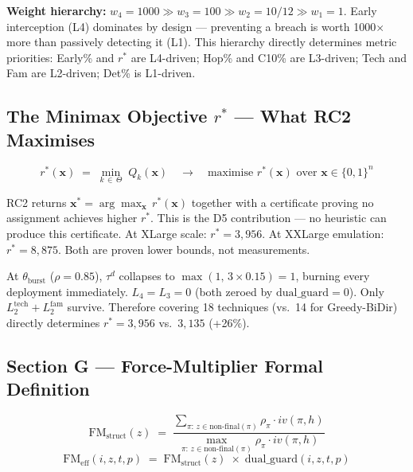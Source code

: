 \documentclass[12pt,a4paper]{article}
\newcommand{\rstar}{r^*}
\newcommand{\xvec}{\mathbf{x}}
\newcommand{\Qkx}{Q_k(\xvec)}
\newcommand{\FMeff}{\mathrm{FM}_{\mathrm{eff}}}
\newcommand{\FMst}{\mathrm{FM}_{\mathrm{struct}}}
\newcommand{\dg}{\mathrm{dual\_guard}}
\newcommand{\taud}{\tau^d}
\begin{document}
\noindent\textbf{Weight hierarchy:} $w_4{=}1000 \gg w_3{=}100 \gg w_2{=}10/12 \gg w_1{=}1$.
Early interception (L4) dominates by design — preventing a breach is worth 1000$\times$
more than passively detecting it (L1). This hierarchy directly determines metric priorities:
Early\% and $\rstar$ are L4-driven; Hop\% and C10\% are L3-driven; Tech and Fam are
L2-driven; Det\% is L1-driven.

\subsection{The Minimax Objective $r^*$ — What RC2 Maximises}
\label{sec:rstar}

\begin{tcolorbox}[colback=AmberLight, colframe=AmberDark, boxrule=0.8pt, arc=4pt]
\begin{equation}
\label{eq:rstar}
\boxed{\quad\rstar(\xvec) \;=\; \min_{k\,\in\,\Theta}\; \Qkx \quad\longrightarrow\quad
\text{maximise } \rstar(\xvec) \text{ over } \xvec\in\{0,1\}^n \quad}
\tag{16}
\end{equation}
\end{tcolorbox}

RC2 returns $\xvec^* = \arg\max_{\xvec}\, \rstar(\xvec)$ together with a certificate proving
no assignment achieves higher $\rstar$. This is the D5 contribution — no heuristic can
produce this certificate. At XLarge scale: $\rstar{=}3{,}956$. At XXLarge emulation:
$\rstar{=}8{,}875$. Both are proven lower bounds, not measurements.

\begin{insight}
At $\theta_{\mathrm{burst}}$ ($\rho{=}0.85$), $\taud$ collapses to
$\max(1,\,3{\times}0.15){=}1$, burning every deployment immediately.
$L_4{=}L_3{=}0$ (both zeroed by $\dg{=}0$). Only $L_2^{\mathrm{tech}}+L_2^{\mathrm{fam}}$
survive. Therefore covering 18 techniques (vs.\ 14 for Greedy-BiDir) directly
determines $\rstar{=}3{,}956$ vs.\ $3{,}135$ (+26\%).
\end{insight}

\subsection{Section G — Force-Multiplier Formal Definition}
\label{sec:fm}

\begin{equation}
\label{eq:fmstruct}
\FMst(z) \;=\; \frac{\displaystyle\sum_{\pi:\,z\in\mathrm{non\text{-}final}(\pi)}\rho_\pi\cdot iv(\pi,h)}
                    {\displaystyle\max_{\pi:\,z\in\mathrm{non\text{-}final}(\pi)}\rho_\pi\cdot iv(\pi,h)}
\tag{17}
\end{equation}
\begin{equation}
\label{eq:fmeff}
\FMeff(i,z,t,p) \;=\; \FMst(z) \;\times\; \dg(i,z,t,p)
\tag{18}
\end{equation}
\end{document}
